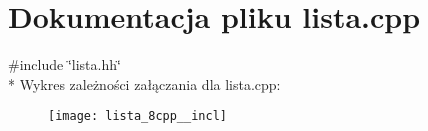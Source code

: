 \section{Dokumentacja pliku lista.\+cpp}
\label{lista_8cpp}
{\ttfamily \#include \char`\"{}lista.\+hh\char`\"{}}\\*
Wykres zależności załączania dla lista.\+cpp\+:\nopagebreak
\begin{figure}[H]
\begin{center}
\leavevmode
\texttt{[image: lista\_8cpp\_\_incl]}
\end{center}
\end{figure}
